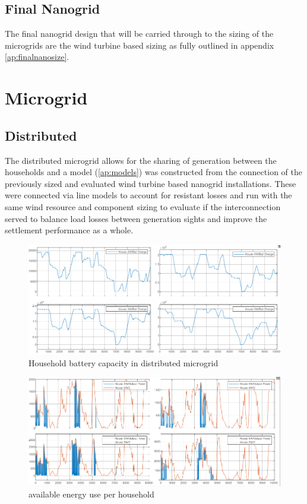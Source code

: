 \documentclass[journal]{IEEEtran}
\begin{document}
\subsection{Final Nanogrid}
The final nanogrid design that will be carried through to the sizing of the microgrids are the wind turbine based sizing as fully outlined in appendix \ref{ap:finalnanosize}.

\section{Microgrid}
        \subsection{Distributed}
        The distributed microgrid allows for the sharing of generation between the households and a model (\ref{ap:models}) was constructed from the connection of the previously sized and evaluated wind turbine based nanogrid installations. These were connected via line models to account for resistant losses and run with the same wind resource and component sizing to evaluate if the interconnection served to balance load losses between generation sights and improve the settlement performance as a whole.

        \begin{figure}[h!]
                \centering
                \includegraphics[width=0.7\linewidth]{fig/distrib_bat.png}
                \caption{Household battery capacity in distributed microgrid}
                \label{fig:distrib_bat}
        \end{figure} 

        \begin{figure}[h!]
                \centering
                \includegraphics[width=0.7\linewidth]{fig/distrib_gen.png}
                \caption{available energy use per household}
                \label{fig:distrib_gen}
        \end{figure} 
\end{document}
